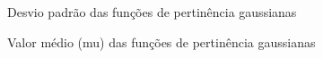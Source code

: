 \begin{simbolos}
    \item[$\sigma$] Desvio padrão das funções de pertinência gaussianas
    \item[$\mu$] Valor médio (mu) das funções de pertinência gaussianas
\end{simbolos}